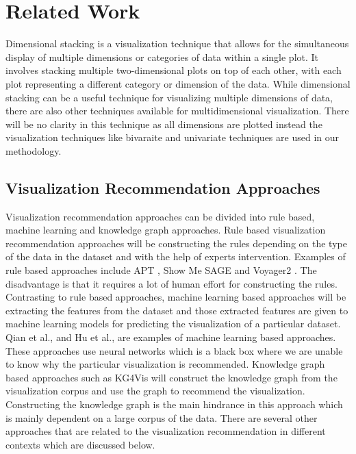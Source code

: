 \chapter{Related Work}
Dimensional stacking is a visualization technique that allows for the simultaneous display of multiple dimensions or categories of data within a single plot. It involves stacking multiple two-dimensional plots on top of each other, with each plot representing a different category or dimension of the data. While dimensional stacking can be a useful technique for visualizing multiple dimensions of data, there are also other techniques available for multidimensional visualization. There will be no clarity in this technique as all dimensions are plotted instead the visualization techniques like bivaraite and univariate techniques are used in our methodology.

\section{Visualization Recommendation Approaches}
Visualization recommendation approaches can be divided into rule based, machine learning and  knowledge graph approaches. Rule based visualization recommendation approaches will be constructing the rules depending on the type of the data in the dataset and with the help of experts intervention. Examples of rule based approaches include APT \cite{mackinlay1986automating}, Show Me\cite{mackinlay2007show} SAGE \cite{roth1994interactive} and Voyager2 \cite{wongsuphasawat2017voyager}. The disadvantage is that it requires a lot of human effort for constructing the rules.  Contrasting to rule based approaches, machine learning based approaches will be extracting the features from the dataset and those extracted features are given to machine learning models for predicting the visualization of a particular dataset.  Qian et al., \cite{qian2020ml} and Hu et al., \cite{hu2019vizml} are examples of machine learning based approaches. These approaches use neural networks which is a black box where we are unable to know why the particular visualization is recommended. Knowledge graph based approaches such as KG4Vis \cite{li2021kg4vis} will construct the knowledge graph from the visualization corpus and use the graph to recommend the visualization. Constructing the knowledge graph is the main hindrance in this approach which is mainly dependent on a large corpus of the data. There are several other approaches that are related to the visualization recommendation in different contexts which are discussed below.

